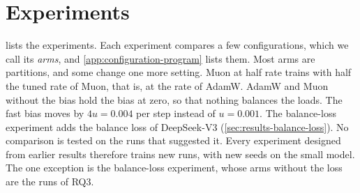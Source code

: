 \section{Experiments}
\label{sec:method-experiments}
 lists the experiments. Each experiment compares a few configurations, which we call its \emph{arms}, and \cref{app:configuration-program} lists them. Most arms are partitions, and some change one more setting. Muon at half rate trains with half the tuned rate of Muon, that is, at the rate of AdamW\@. AdamW and Muon without the bias hold the bias at zero, so that nothing balances the loads. The fast bias moves by $4u = 0.004$ per step instead of $u = 0.001$. The balance-loss experiment adds the balance loss of DeepSeek-V3 (\cref{sec:results-balance-loss}). No comparison is tested on the runs that suggested it. Every experiment designed from earlier results therefore trains new runs, with new seeds on the small model. The one exception is the balance-loss experiment, whose arms without the loss are the runs of RQ3.

